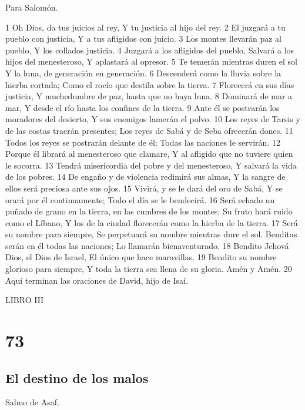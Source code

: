 Para Salomón.

1 Oh Dios, da tus juicios al rey,
Y tu justicia al hijo del rey.
2 El juzgará a tu pueblo con justicia,
Y a tus afligidos con juicio.
3 Los montes llevarán paz al pueblo,
Y los collados justicia.
4 Juzgará a los afligidos del pueblo,
Salvará a los hijos del menesteroso,
Y aplastará al opresor.
5 Te temerán mientras duren el sol
Y la luna, de generación en generación.
6 Descenderá como la lluvia sobre la hierba cortada;
Como el rocío que destila sobre la tierra.
7 Florecerá en sus días justicia,
Y muchedumbre de paz, hasta que no haya luna.
8 Dominará de mar a mar,
Y desde el río hasta los confines de la tierra. 
9 Ante él se postrarán los moradores del desierto,
Y sus enemigos lamerán el polvo.
10 Los reyes de Tarsis y de las costas traerán presentes;
Los reyes de Sabá y de Seba ofrecerán dones.
11 Todos los reyes se postrarán delante de él;
Todas las naciones le servirán.
12 Porque él librará al menesteroso que clamare,
Y al afligido que no tuviere quien le socorra.
13 Tendrá misericordia del pobre y del menesteroso,
Y salvará la vida de los pobres.
14 De engaño y de violencia redimirá sus almas,
Y la sangre de ellos será preciosa ante sus ojos.
15 Vivirá, y se le dará del oro de Sabá,
Y se orará por él continuamente;
Todo el día se le bendecirá.
16 Será echado un puñado de grano en la tierra, en las cumbres de los montes;
Su fruto hará ruido como el Líbano,
Y los de la ciudad florecerán como la hierba de la tierra.
17 Será su nombre para siempre,
Se perpetuará su nombre mientras dure el sol.
Benditas serán en él todas las naciones;
Lo llamarán bienaventurado.
18 Bendito Jehová Dios, el Dios de Israel,
El único que hace maravillas.
19 Bendito su nombre glorioso para siempre,
Y toda la tierra sea llena de su gloria.
Amén y Amén.
20 Aquí terminan las oraciones de David, hijo de Isaí.


LIBRO III

\chapter{73}

\section*{El destino de los malos}

Salmo de Asaf.

